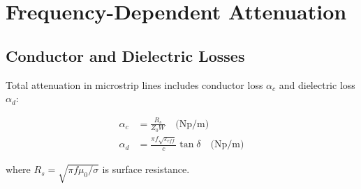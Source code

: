 \documentclass[11pt,a4paper]{article}
\begin{document}
\section{Frequency-Dependent Attenuation}

\subsection{Conductor and Dielectric Losses}

Total attenuation in microstrip lines includes conductor loss $\alpha_c$ and dielectric loss $\alpha_d$:

\begin{align}
\alpha_c &= \frac{R_s}{Z_0 W} \quad \text{(Np/m)} \\
\alpha_d &= \frac{\pi f \sqrt{\varepsilon_{eff}}}{c} \tan\delta \quad \text{(Np/m)}
\end{align}

where $R_s = \sqrt{\pi f \mu_0 / \sigma}$ is surface resistance.
\end{document}
